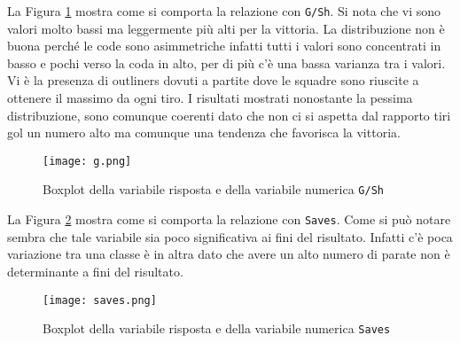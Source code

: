 La Figura \ref{fig:g} mostra come si comporta la relazione con \texttt{G/Sh}. Si nota che vi sono valori molto bassi ma leggermente più alti per la vittoria. La distribuzione non è buona perché le code sono asimmetriche infatti tutti i valori sono concentrati in basso e pochi verso la coda in alto, per di più c'è una bassa varianza tra i valori. Vi è la presenza di outliners dovuti a partite dove le squadre sono riuscite a ottenere il massimo da ogni tiro. I risultati mostrati nonostante la pessima distribuzione, sono comunque coerenti dato che non ci si aspetta dal rapporto tiri gol un numero alto ma comunque una tendenza che favorisca la vittoria.\\
 
\begin{figure}[htbp]
	\begin{center}
		\texttt{[image: g.png]}
		\caption{Boxplot della variabile risposta e della variabile numerica \texttt{G/Sh} } \label{fig:g}
	\end{center}
\end{figure}

La Figura \ref{fig:saves} mostra come si comporta la relazione con \texttt{Saves}. Come si può notare sembra che tale variabile sia poco significativa ai fini del risultato. Infatti c'è poca variazione tra una classe è in altra dato che avere un alto numero di parate non è determinante a fini del risultato.\\

\begin{figure}[htbp]
	\begin{center}
		\texttt{[image: saves.png]}
		\caption{Boxplot della variabile risposta e della variabile numerica \texttt{Saves} } \label{fig:saves}
	\end{center}
\end{figure}

